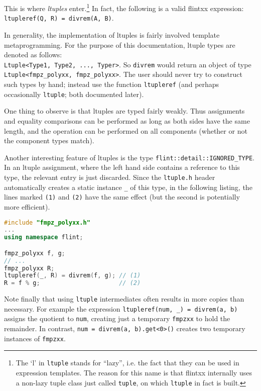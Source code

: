 \documentclass[a4paper,10pt]{book}
\newcommand{\code}{\lstinline}
\begin{document}
{{This is where \emph{ltuples} enter.\footnote{The `l' in \code{ltuple} stands for
``lazy'', i.e. the fact that they can be used in expression templates.
The reason for this name
is that flintxx internally uses a non-lazy tuple class just
called \code{tuple}, on which \code{ltuple} in fact is built.}
In fact, the following is a valid
flintxx expression:\\
\code{ltupleref(Q, R) = divrem(A, B)}.

In generality, the implementation of ltuples is fairly involved template
metaprogramming. For the purpose of this documentation, ltuple types are denoted
as follows:\\
\code{Ltuple<Type1, Type2, ..., Typer>}. So \code{divrem} would
return an object of type\\
\code{Ltuple<fmpz_polyxx, fmpz_polyxx>}. The user
should never try to construct such types by hand; instead use the function
\code{ltupleref} (and perhaps occasionally \code{ltuple}; both documented
later).

One thing to observe is that ltuples are typed fairly weakly. Thus assignments
and equality comparisons can be performed as long as both sides have the same
length, and the operation can be performed on all components (whether or not the
component types match).

Another interesting feature of ltuples is the type
\code{flint::detail::IGNORED_TYPE}.
In an ltuple assignment, where the left hand side contains a reference to this
type, the relevant entry is just discarded. Since the \code{ltuple.h} header
automatically creates a static instance \code{_} of this type,
in the following listing, the
lines marked \code{(1)} and \code{(2)} have the same effect (but the second is
potentially more efficient).

\begin{lstlisting}[language=c++]
#include "fmpz_polyxx.h"
...
using namespace flint;

fmpz_polyxx f, g;
// ...
fmpz_polyxx R;
ltupleref(_, R) = divrem(f, g); // (1)
R = f % g;                      // (2)
\end{lstlisting}

Note finally that using \code{ltuple} intermediates often results in more copies
than necessary. For example the expression
\code{ltupleref(num, _) = divrem(a, b)} assigns the quotient to \code{num},
creating just a temporary \code{fmpzxx} to hold the remainder. In contrast,
\code{num = divrem(a, b).get<0>()} creates two temporary instances of
\code{fmpzxx}.

}}
\end{document}
